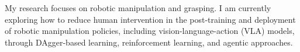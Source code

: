 My research focuses on robotic manipulation and grasping. I am currently exploring how to reduce human intervention in the post-training and deployment of robotic manipulation policies, including vision-language-action (VLA) models, through DAgger-based learning, reinforcement learning, and agentic approaches.
